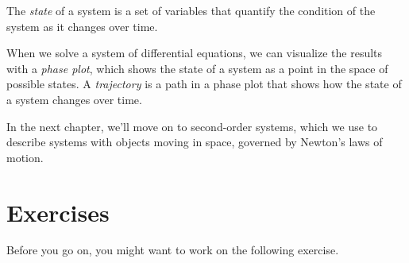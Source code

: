 The \emph{state} of a system is a set of variables that quantify the condition of the system as it changes over time.

When we solve a system of differential equations, we can visualize the results with a \emph{phase plot}, which shows the state of a system as a point in the space of possible states.
A \emph{trajectory} is a path in a phase plot that shows how the state of a system changes over time.

In the next chapter, we'll move on to second-order systems, which we use to describe systems
with objects moving in space, governed by Newton's laws of motion.


\section{Exercises}

Before you go on, you might want to work on the following exercise.

